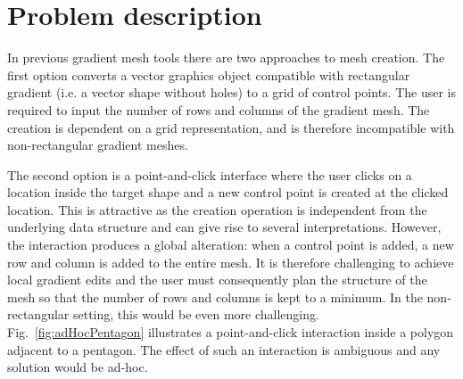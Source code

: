 \documentclass{egpubl}
\newcommand{\note}[3]{{\color{#2}\textbf{#1: #3}}}
\newcommand{\john}[1]{\note{JohnKa}{RubineRed}{#1}}
\begin{document}
	
	\section{Problem description}
	\label{sec:overview}
	
	In previous gradient mesh tools there are two approaches to mesh creation. The first option converts a vector graphics object compatible with rectangular gradient (i.e. a vector shape without holes) to a grid of control points. The user is required to input the number of rows and columns of the gradient mesh. The creation is dependent on a grid representation, and is therefore incompatible with non-rectangular gradient meshes.
	
	The second option is a point-and-click interface where the user clicks on a location inside the target shape and a new control point is created at the clicked location. This is attractive as the creation operation is independent from the underlying data structure and can give rise to several interpretations. However, the interaction produces a global alteration: when a control point is added, a new row and column is added to the entire mesh. It is therefore challenging to achieve local gradient edits and the user must consequently plan the structure of the mesh so that the number of rows and columns is kept to a minimum. In the non-rectangular setting, this would be even more challenging. Fig.~\ref{fig:adHocPentagon} illustrates a point-and-click interaction inside a polygon adjacent to a pentagon. The effect of such an interaction is ambiguous and any solution would be ad-hoc.
	
	
\end{document}
